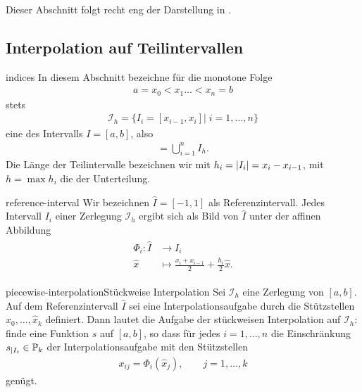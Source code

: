 Dieser Abschnitt folgt recht eng der Darstellung in \cite[Abschnitt 2.3]{Rannacher17}.

\subsection{Interpolation auf Teilintervallen}

\begin{Notation}{indices}
  In diesem Abschnitt bezeichne für die monotone Folge
  \begin{gather}
    a = x_0 < x_1 \dots < x_n = b
  \end{gather}
  stets
  \begin{gather}
    \mathcal I_h = \bigl\{ I_i = [x_{i-1},x_i] \big|
    \; i=1,\dots,n\bigr\}
  \end{gather}
  eine  des Intervalls $I=[a,b]$, also
  \begin{gather}
    [a,b] = \bigcup_{i=1}^n I_h.
  \end{gather}
  Die Länge der Teilintervalle bezeichnen wir mit
  $h_i = \abs{I_i} = x_{i} - x_{i-1}$, mit $h=\max h_i$ die
   der Unterteilung.
\end{Notation}

\begin{Notation}{reference-interval}
  Wir bezeichnen $\hat I = [-1,1]$ als Referenzintervall. Jedes
  Intervall $I_i$ einer Zerlegung $\mathcal I_h$ ergibt sich als Bild
  von $\hat I$ unter der affinen Abbildung
  \begin{gather}
    \begin{split}
      \Phi_i\colon \hat I &\to I_i\\
      \hat x &\mapsto \tfrac{x_{i}+x_{i-1}}{2} + \tfrac{h_i}{2} \hat x.
    \end{split}
  \end{gather}
\end{Notation}

\begin{Definition*}{piecewise-interpolation}{Stückweise Interpolation}
  Sei $\mathcal I_h$ eine Zerlegung von $[a,b]$. Auf dem
  Referenzintervall $\hat I$ sei eine Interpolationsaufgabe durch die
  Stützstellen $\hat x_0,\dots, \hat x_k$ definiert. Dann lautet die
  Aufgabe der stückweisen Interpolation auf $\mathcal I_h$: finde eine
  Funktion $s$ auf $[a,b]$, so dass für jedes $i=1,\dots,n$ die
  Einschränkung $s_{|I_i} \in \P_k$ der Interpolationsaufgabe mit den
  Stützstellen
  \begin{gather}
    x_{ij} = \Phi_i(\hat x_j),\qquad j=1,\dots,k
  \end{gather}
  genügt.
\end{Definition*}


